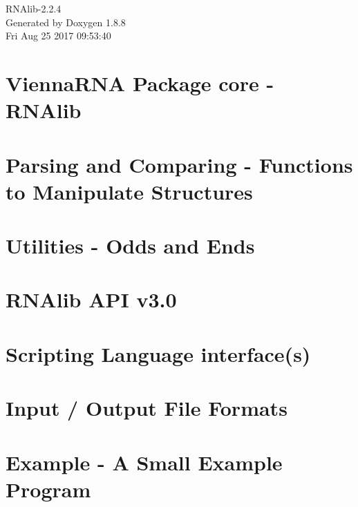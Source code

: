 \documentclass[twoside]{book}
\newcommand{\+}{\discretionary{\mbox{\scriptsize$\hookleftarrow$}}{}{}}
\newcommand{\clearemptydoublepage}{%
  \newpage{\pagestyle{empty}\cleardoublepage}%
}
\begin{document}
\hypersetup{pageanchor=false,
             bookmarks=true,
             bookmarksnumbered=true,
             pdfencoding=unicode
            }
\begin{titlepage}
\vspace*{7cm}
\begin{center}%
{\Large R\+N\+Alib-\/2.2.4 }\\
\vspace*{1cm}
{\large Generated by Doxygen 1.8.8}\\
\vspace*{0.5cm}
{\small Fri Aug 25 2017 09:53:40}\\
\end{center}
\end{titlepage}
\clearemptydoublepage
\tableofcontents
\clearemptydoublepage
{}
\hypersetup{pageanchor=true}

\chapter{Vienna\+R\+N\+A Package core -\/ R\+N\+Alib}
\label{index}\hypertarget{index}{}
\chapter{Parsing and Comparing -\/ Functions to Manipulate Structures}
\label{mp_parse}
\hypertarget{mp_parse}{}

\chapter{Utilities -\/ Odds and Ends}
\label{mp_utils}
\hypertarget{mp_utils}{}

\chapter{R\+N\+Alib A\+P\+I v3.0}
\label{newAPI}
\hypertarget{newAPI}{}

\chapter{Scripting Language interface(s)}
\label{swig_interface}
\hypertarget{swig_interface}{}

\chapter{Input / Output File Formats}
\label{file_formats}
\hypertarget{file_formats}{}

\chapter{Example -\/ A Small Example Program}
\label{mp_example}
\hypertarget{mp_example}{}

\end{document}
